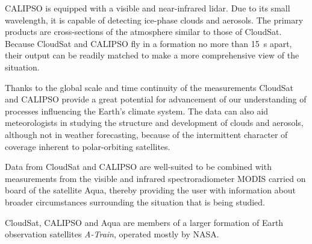CALIPSO is equipped with a visible and near-infrared lidar. Due to its small
wavelength, it is capable of detecting ice-phase clouds and aerosols. The primary
products are cross-sections of the atmosphere similar to those of CloudSat.
Because CloudSat and CALIPSO fly in a formation no more than \SI{15}{s} apart, their
output can be readily matched to make a more comprehensive view of the
situation.

Thanks to the global scale and time continuity of the measurements CloudSat
and CALIPSO provide a great potential for advancement of our understanding of
processes influencing the Earth's climate system. The data can also aid
meteorologists in studying the structure and development of clouds and aerosols,
although not in weather forecasting, because of the intermittent character of
coverage inherent to polar-orbiting satellites.

Data from CloudSat and CALIPSO are well-suited to be combined with
measurements from the visible and infrared spectroradiometer MODIS carried on
board of
the satellite Aqua, thereby providing the user with information about broader
circumstances surrounding the situation that is being studied.

CloudSat, CALIPSO and Aqua are members of a larger formation of Earth
observation satellites \textit{A-Train},
operated mostly by NASA.

